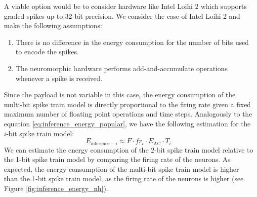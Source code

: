         A viable option would be to consider hardware like Intel Loihi 2 which supports graded spikes up to 32-bit precision. We consider the case of Intel Loihi 2 and make the following assumptions: 
        \begin{enumerate}
            \item There is no difference in the energy consumption for the number of bits used to encode the spikes.
            \item The neuromorphic hardware performs add-and-accumulate operations whenever a spike is received. 
        \end{enumerate}
        Since the payload is not variable in this case, the energy consumption of the multi-bit spike train model is directly proportional to the firing rate given a fixed maximum number of floating point operations and time steps. Analogously to the equation \ref{eq:inference_energy_popular}, we have the following estimation for the $i$-bit spike train model:
        \begin{equation}
            E_{\text{inference}-i} \approx F \cdot fr_i \cdot E_{\text{AC}} \cdot T_i
        \end{equation}
        We can estimate the energy consumption of the 2-bit spike train model relative to the 1-bit spike train model by comparing the firing rate of the neurons. As expected, the energy consumption of the multi-bit spike train model is higher than the 1-bit spike train model, as the firing rate of the neurons is higher (see Figure \ref{fig:inference_energy_nh}).
